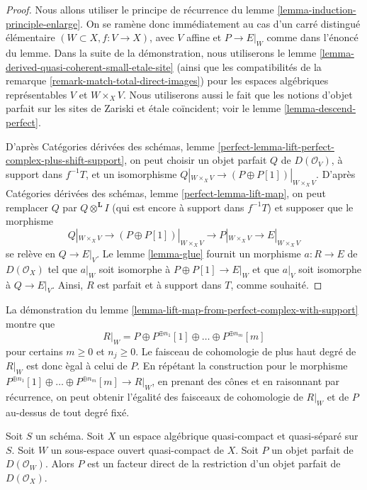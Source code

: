 \begin{proof}
Nous allons utiliser le principe de r\'ecurrence du lemme
\ref{lemma-induction-principle-enlarge}. On se ram\`ene donc imm\'ediatement
au cas d'un carr\'e distingu\'e \'el\'ementaire
$(W\subset X,f:V\to X)$, avec $V$ affine et $P\to E|_W$ comme dans l'\'enonc\'e
du lemme. Dans la suite de la d\'emonstration, nous utiliserons le lemme
\ref{lemma-derived-quasi-coherent-small-etale-site} (ainsi que les
compatibilit\'es de la remarque \ref{remark-match-total-direct-images}) pour
les espaces alg\'ebriques repr\'esentables $V$ et $W\times_XV$. Nous
utiliserons aussi le fait que les notions d'objet parfait sur les sites de
Zariski et \'etale co\"incident; voir le lemme \ref{lemma-descend-perfect}.

\medskip\noindent
D'apr\`es Cat\'egories d\'eriv\'ees des sch\'emas, lemme
\ref{perfect-lemma-lift-perfect-complex-plus-shift-support}, on peut choisir un
objet parfait $Q$ de $D(\mathcal{O}_V)$, \`a support dans $f^{-1}T$, et un
isomorphisme
$Q|_{W\times_XV}\to(P\oplus P[1])|_{W\times_XV}$. D'apr\`es Cat\'egories
d\'eriv\'ees des sch\'emas, lemme \ref{perfect-lemma-lift-map}, on peut
remplacer $Q$ par $Q\otimes^\mathbf{L}I$ (qui est encore \`a support dans
$f^{-1}T$) et supposer que le morphisme
$$
Q|_{W \times_X V} \to (P \oplus P[1])|_{W \times_X V}
\longrightarrow P|_{W \times_X V}
\longrightarrow
E|_{W \times_X V}
$$
se rel\`eve en $Q\to E|_V$. Le lemme \ref{lemma-glue} fournit un morphisme
$a:R\to E$ de $D(\mathcal{O}_X)$ tel que $a|_W$ soit isomorphe \`a
$P\oplus P[1]\to E|_W$ et que $a|_V$ soit isomorphe \`a $Q\to E|_V$.
Ainsi, $R$ est parfait et \`a support dans $T$, comme souhait\'e.
\end{proof}

\begin{remark}
\label{remark-addendum}
La d\'emonstration du lemme
\ref{lemma-lift-map-from-perfect-complex-with-support} montre que
$$
R|_W = P \oplus P^{\oplus n_1}[1] \oplus \ldots \oplus P^{\oplus n_m}[m]
$$
pour certains $m\geq0$ et $n_j\geq0$. Le faisceau de cohomologie de plus haut
degr\'e de $R|_W$ est donc \`egal \`a celui de $P$. En r\'ep\'etant la
construction pour le morphisme
$P^{\oplus n_1}[1]\oplus\ldots\oplus P^{\oplus n_m}[m]\to R|_W$, en prenant
des c\^ones et en raisonnant par r\'ecurrence, on peut obtenir l'\'egalit\'e des
faisceaux de cohomologie de $R|_W$ et de $P$ au-dessus de tout degr\'e fix\'e.
\end{remark}

\begin{lemma}
\label{lemma-direct-summand-of-a-restriction}
Soit $S$ un sch\'ema. Soit $X$ un espace alg\'ebrique quasi-compact et
quasi-s\'epar\'e sur $S$. Soit $W$ un sous-espace ouvert quasi-compact de $X$.
Soit $P$ un objet parfait de $D(\mathcal{O}_W)$. Alors $P$ est un facteur
direct de la restriction d'un objet parfait de $D(\mathcal{O}_X)$.
\end{lemma}

